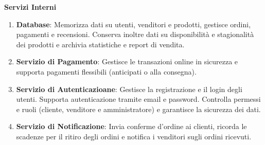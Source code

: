 \begin{attori}
\begin{enumerate}
\begin{enumerate}
        \end{enumerate}
    \end{enumerate}

    \item \textbf{Servizi Interni}
    \begin{enumerate}
        \item \textbf{Database}: Memorizza dati su utenti, venditori e prodotti, gestisce ordini, pagamenti e recensioni. Conserva inoltre dati su disponibilità e stagionalità dei prodotti e archivia statistiche e report di vendita.
        \item \textbf{Servizio di Pagamento}: Gestisce le transazioni online in sicurezza e supporta pagamenti flessibili (anticipati o alla consegna).
        \item \textbf{Servizio di Autenticazioane}: Gestisce la registrazione e il login degli utenti. Supporta autenticazione tramite email e password. Controlla permessi e ruoli (cliente, venditore e amministratore) e garantisce la sicurezza dei dati.
        \item \textbf{Servizio di Notificazione}: Invia conferme d’ordine ai clienti, ricorda le scadenze per il ritiro degli ordini e notifica i venditori sugli ordini ricevuti. 
    \end{enumerate}
\end{attori}

\newpage